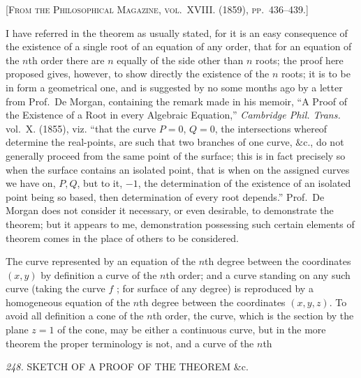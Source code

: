 \documentclass[11pt,a4paper]{article}
\begin{document}
\textsc{[From the Philosophical Magazine, vol.~XVIII. (1859), pp.~436--439.]}

\medskip

I have referred in the theorem as usually stated, for it is an easy consequence of the existence of a single root of an equation of any order, that for an equation of the $n$th order there are $n$ equally of the side other than $n$ roots; the proof here proposed gives, however, to show directly the existence of the $n$ roots; it is to be in form a geometrical one, and is suggested by no some months ago by a letter from Prof.~De Morgan, containing the remark made in his memoir, ``A Proof of the Existence of a Root in every Algebraic Equation,'' \textit{Cambridge Phil. Trans.} vol.~X. (1855), viz. ``that the curve $P=0$, $Q=0$, the intersections whereof determine the real-points, are such that two branches of one curve, $\&$c., do not generally proceed from the same point of the surface; this is in fact precisely so when the surface contains an isolated point, that is when on the assigned curves we have on, $P, Q$, but to it, $-1$, the determination of the existence of an isolated point being so based, then determination of every root depends.'' Prof.~De Morgan does not consider it necessary, or even desirable, to demonstrate the theorem; but it appears to me, demonstration possessing such certain elements of theorem comes in the place of others to be considered.

The curve represented by an equation of the $n$th degree between the coordinates $(x, y)$ by definition a curve of the $n$th order; and a curve standing on any such curve (taking the curve $f$ ; for surface of any degree) is reproduced by a homogeneous equation of the $n$th degree between the coordinates $(x, y, z)$. To avoid all definition a cone of the $n$th order, the curve, which is the section by the plane $z = 1$ of the cone, may be either a continuous curve, but in the more theorem the proper terminology is not, and a curve of the $n$th

\setcounter{page}{117}

\noindent\textit{248.} \quad SKETCH OF A PROOF OF THE THEOREM \&c.
\end{document}
